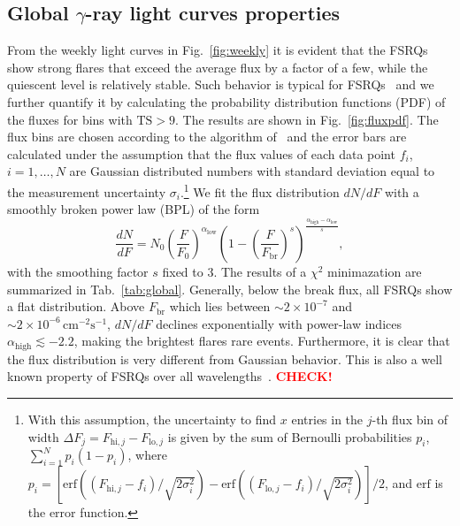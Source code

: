 \documentclass[twocolumn]{aastex62}
\newcommand{\gray}{$\gamma$-ray\xspace}
\newcommand{\todo}[1]{\textbf{\textcolor{red}{#1}}}
\begin{document}
\subsection{Global \gray light curves properties}
From the weekly light curves in Fig.~\ref{fig:weekly} it is evident that the FSRQs show strong flares that exceed the average flux by a factor of a few, while the quiescent level is relatively stable. 
Such behavior is typical for FSRQs~\citet{} and we 
further quantify it by calculating the probability distribution functions (PDF) of the fluxes for bins with $\mathrm{TS} > 9$. 
The results are shown in Fig.~\ref{fig:fluxpdf}. The flux bins are chosen according to the algorithm of~\citet{knuth2006} and the error bars are calculated under the assumption that the flux values of each data point $f_i$, $i = 1,\ldots,N$ are Gaussian distributed numbers with standard deviation equal to the measurement uncertainty $\sigma_i$.\footnote{
With this assumption, the uncertainty to find $x$ entries in the $j$-th flux bin of width $\Delta F_j = F_{\mathrm{hi},j} - F_{\mathrm{lo},j}$ is given by the sum of Bernoulli probabilities $p_i$, $\sum_{i = 1}^N p_i(1-p_i)$, where $p_i =  [\mathrm{erf}((F_{\mathrm{hi},j} - f_i) / \sqrt{2\sigma_i^2}) - \mathrm{erf}((F_{\mathrm{lo},j} - f_i) / \sqrt{2\sigma_i^2})]/2$, and $\mathrm{erf}$ is the error function.
}
We fit the flux distribution $dN/dF$ with a smoothly broken power law (BPL) of the form 
\begin{equation}
    \frac{dN}{dF} = N_0 \left( \frac{F}{F_0}\right)^{\alpha_\mathrm{low}}
        \left( 1 - \left(\frac{F}{F_\mathrm{br}}\right)^s \right)^{\frac{\alpha_\mathrm{high} - \alpha_\mathrm{low}}{s}},
\end{equation}
with the smoothing factor $s$ fixed to 3. 
The results of a $\chi^2$ minimazation are summarized in Tab.~\ref{tab:global}.
Generally, below the break flux, all FSRQs show a flat distribution.
Above $F_\mathrm{br}$ which lies between $\sim2\times10^{-7}$ and $\sim2\times10^{-6}\,\mathrm{cm}^{-2}\mathrm{s}^{-1}$, $dN/dF$ declines exponentially with power-law indices $\alpha_\mathrm{high} \lesssim -2.2$, making the brightest flares rare events.
Furthermore, it is clear that the flux distribution is very different from Gaussian behavior. 
This is also a well known property of FSRQs over all wavelengths~\citet[][]{}. \todo{CHECK!}
\end{document}
